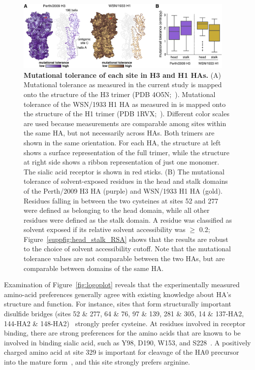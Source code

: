 \documentclass[9pt,twocolumn,twoside]{pnas-new}
\begin{document}
\begin{figure}[ht]
\centering
\includegraphics[width=0.95\textwidth]{figs/mut_tolerance/mut_tolerance_new.pdf}
\caption{\label{fig:mut_tolerance}
{\bf Mutational tolerance of each site in H3 and H1 HAs.}
(A) Mutational tolerance as measured in the current study is mapped onto the structure of the H3 trimer (PDB 4O5N;~\cite{lee2014receptor}).
Mutational tolerance of the WSN/1933 H1 HA as measured in \cite{doud2016accurate} is mapped onto the structure of the H1 trimer (PDB 1RVX;~\cite{gamblin2004structure}).
Different color scales are used because measurements are comparable among sites within the same HA, but not necessarily across HAs.
Both trimers are shown in the same orientation.
For each HA, the structure at left shows a surface representation of the full trimer, while the structure at right side shows a ribbon representation of just one monomer.
The sialic acid receptor is shown in red sticks.
(B) The mutational tolerance of solvent-exposed residues in the head and stalk domains of the Perth/2009 H3 HA (purple) and WSN/1933 H1 HA (gold).
Residues falling in between the two cysteines at sites 52 and 277 were defined as belonging to the head domain, while all other residues were defined as the stalk domain.
A residue was classified as solvent exposed if its relative solvent accessibility was $\geq$ 0.2; Figure~\ref{suppfig:head_stalk_RSA} shows that the results are robust to the choice of solvent accessibility cutoff.
Note that the mutational tolerance values are not comparable between the two HAs, but are comparable between domains of the same HA.
}
\end{figure}

Examination of Figure~\ref{fig:logoplot} reveals that the experimentally measured amino-acid preferences generally agree with existing knowledge about HA's structure and function.
For instance, sites that form structurally important disulfide bridges (sites 52 \& 277, 64 \& 76, 97 \& 139, 281 \& 305, 14 \& 137-HA2, 144-HA2 \& 148-HA2)~\cite{waterfield1981disulphide} strongly prefer cysteine.
At residues involved in receptor binding, there are strong preferences for the amino acids that are known to be involved in binding sialic acid, such as Y98, D190, W153, and S228~\cite{weis1988structure,martin1998studies,nobusawa2000change,yang2015structure}.
A positively charged amino acid at site 329 is important for cleavage of the HA0 precursor into the mature form~\cite{stech2005new}, and this site strongly prefers arginine.
\end{document}
